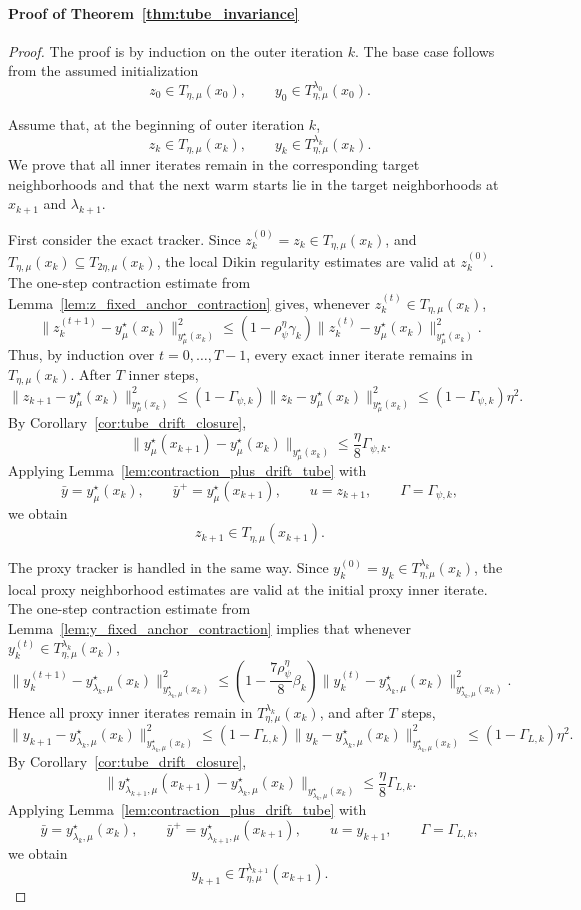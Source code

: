 \documentclass{article}
\begin{document}
\paragraph{Proof of Theorem~\ref{thm:tube_invariance}}
\begin{proof}
The proof is by induction on the outer iteration \(k\). The base case follows from the assumed
initialization
\[
z_0\in T_{\eta,\mu}(x_0),
\qquad
y_0\in T_{\eta,\mu}^{\lambda_0}(x_0).
\]

Assume that, at the beginning of outer iteration \(k\),
\[
z_k\in T_{\eta,\mu}(x_k),
\qquad
y_k\in T_{\eta,\mu}^{\lambda_k}(x_k).
\]
We prove that all inner iterates remain in the corresponding target neighborhoods and that the next warm
starts lie in the target neighborhoods at \(x_{k+1}\) and \(\lambda_{k+1}\).

First consider the exact tracker. Since \(z_k^{(0)}=z_k\in T_{\eta,\mu}(x_k)\), and
\(T_{\eta,\mu}(x_k)\subseteq T_{2\eta,\mu}(x_k)\), the local Dikin regularity estimates are valid at
\(z_k^{(0)}\). The one-step contraction estimate from Lemma~\ref{lem:z_fixed_anchor_contraction} gives, whenever
\(z_k^{(t)}\in T_{\eta,\mu}(x_k)\),
\[
\|z_k^{(t+1)}-y_\mu^\star(x_k)\|_{y_\mu^\star(x_k)}^2
\le
(1-\rho_\psi^\eta\gamma_k)
\|z_k^{(t)}-y_\mu^\star(x_k)\|_{y_\mu^\star(x_k)}^2 .
\]
Thus, by induction over \(t=0,\ldots,T-1\), every exact inner iterate remains in
\(T_{\eta,\mu}(x_k)\). After \(T\) inner steps,
\[
\|z_{k+1}-y_\mu^\star(x_k)\|_{y_\mu^\star(x_k)}^2
\le
(1-\Gamma_{\psi,k})
\|z_k-y_\mu^\star(x_k)\|_{y_\mu^\star(x_k)}^2
\le
(1-\Gamma_{\psi,k})\eta^2 .
\]
By Corollary~\ref{cor:tube_drift_closure},
\[
\|y_\mu^\star(x_{k+1})-y_\mu^\star(x_k)\|_{y_\mu^\star(x_k)}
\le
\frac{\eta}{8}\Gamma_{\psi,k}.
\]
Applying Lemma~\ref{lem:contraction_plus_drift_tube} with
\[
\bar y=y_\mu^\star(x_k),
\qquad
\bar y^+=y_\mu^\star(x_{k+1}),
\qquad
u=z_{k+1},
\qquad
\Gamma=\Gamma_{\psi,k},
\]
we obtain
\[
z_{k+1}\in T_{\eta,\mu}(x_{k+1}).
\]

The proxy tracker is handled in the same way. Since
\(y_k^{(0)}=y_k\in T_{\eta,\mu}^{\lambda_k}(x_k)\), the local proxy neighborhood estimates are valid at the
initial proxy inner iterate. The one-step contraction estimate from Lemma~\ref{lem:y_fixed_anchor_contraction}
implies that whenever \(y_k^{(t)}\in T_{\eta,\mu}^{\lambda_k}(x_k)\),
\[
\|y_k^{(t+1)}-y_{\lambda_k,\mu}^\star(x_k)\|_{y_{\lambda_k,\mu}^\star(x_k)}^2
\le
\left(1-\frac{7\rho_\psi^\eta}{8}\beta_k\right)
\|y_k^{(t)}-y_{\lambda_k,\mu}^\star(x_k)\|_{y_{\lambda_k,\mu}^\star(x_k)}^2 .
\]
Hence all proxy inner iterates remain in \(T_{\eta,\mu}^{\lambda_k}(x_k)\), and after \(T\) steps,
\[
\|y_{k+1}-y_{\lambda_k,\mu}^\star(x_k)\|_{y_{\lambda_k,\mu}^\star(x_k)}^2
\le
(1-\Gamma_{L,k})
\|y_k-y_{\lambda_k,\mu}^\star(x_k)\|_{y_{\lambda_k,\mu}^\star(x_k)}^2
\le
(1-\Gamma_{L,k})\eta^2 .
\]
By Corollary~\ref{cor:tube_drift_closure},
\[
\|y_{\lambda_{k+1},\mu}^\star(x_{k+1})
-y_{\lambda_k,\mu}^\star(x_k)\|_{y_{\lambda_k,\mu}^\star(x_k)}
\le
\frac{\eta}{8}\Gamma_{L,k}.
\]
Applying Lemma~\ref{lem:contraction_plus_drift_tube} with
\[
\bar y=y_{\lambda_k,\mu}^\star(x_k),
\qquad
\bar y^+=y_{\lambda_{k+1},\mu}^\star(x_{k+1}),
\qquad
u=y_{k+1},
\qquad
\Gamma=\Gamma_{L,k},
\]
we obtain
\[
y_{k+1}\in T_{\eta,\mu}^{\lambda_{k+1}}(x_{k+1}).
\]


\end{proof}
\end{document}
